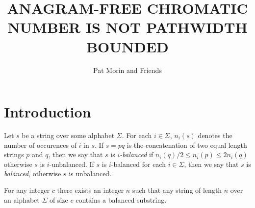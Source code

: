 \documentclass{patmorin}
\title{\MakeUppercase{Anagram-Free Chromatic Number is not Pathwidth Bounded}}
\author{Pat Morin and Friends}%
\begin{document}
\maketitle
%
\begin{abstract}
\end{abstract}
%
%


\section{Introduction}

Let $s$ be a string over some alphabet $\Sigma$.  For each $i\in\Sigma$,
$n_i(s)$ denotes the number of occurences of $i$ in $s$.  If $s=pq$ is the
concatenation of two equal length strings $p$ and $q$, then we say that
$s$ is \emph{$i$-balanced} if $n_i(q)/2\le n_i(p)\le 2n_i(q)$ otherwise
$s$ is $i$-unbalanced.  If $s$ is $i$-balanced for each $i\in \Sigma$,
then we say that $s$ is \emph{balanced}, otherwise $s$ is unbalanced.

\begin{lem}
  For any integer $c$ there exists an integer $n$ such that any string
  of length $n$ over an alphabet $\Sigma$ of size $c$ contains a balanced
  substring.
\end{lem}
\end{document}

